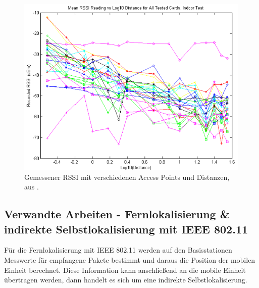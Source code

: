\begin{figure}[h]
  \centering
	\includegraphics[width=\textwidth]{images/luiRSSI.png}
  \caption{Gemessener RSSI mit verschiedenen Access Points und Distanzen, aus \cite{lui2011differences}.}
  \label{fig:luiRSSI}
\end{figure}




\subsection{Verwandte Arbeiten - Fernlokalisierung \& indirekte Selbstlokalisierung mit IEEE 802.11}
Für die Fernlokalisierung mit IEEE 802.11 werden auf den Basisstationen Messwerte für empfangene Pakete bestimmt und daraus die Position der mobilen Einheit berechnet.
Diese Information kann anschließend an die mobile Einheit übertragen werden, dann handelt es sich um eine indirekte Selbstlokalisierung.

